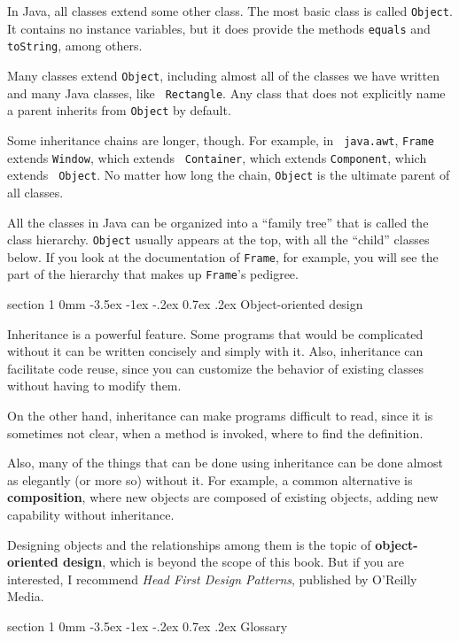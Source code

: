 \documentclass{book}
\makeatletter
\renewcommand{\section}{\@startsection 
    {section} {1} {0mm}%
    {-3.5ex \@plus -1ex \@minus -.2ex}%
    {0.7ex \@plus.2ex}%
    {\normalfont\Large\bfseries}}
\makeatother
\begin{document}
In Java, all classes extend some other class.  The most basic class is
called {\tt Object}.  It contains no instance variables, but it does
provide the methods {\tt equals} and {\tt toString}, among others.

Many classes extend {\tt Object}, including almost all of the classes
we have written and many Java classes, like {\tt
Rectangle}.  Any class that does not explicitly name a parent inherits
from {\tt Object} by default.

Some inheritance chains are longer, though.  For example, in {\tt
  java.awt}, {\tt Frame} extends {\tt Window}, which extends {\tt
  Container}, which extends {\tt Component}, which extends {\tt
  Object}.  No matter how long the chain, {\tt Object} is the ultimate
parent of all classes.

All the classes in Java can be organized into a ``family tree'' that
is called the class hierarchy.  {\tt Object} usually appears at the
top, with all the ``child'' classes below.  If you look at the
documentation of {\tt Frame}, for example, you will see the part of
the hierarchy that makes up {\tt Frame}'s pedigree.


\section {Object-oriented design}

Inheritance is a powerful feature.  Some programs that would be
complicated without it can be written concisely and simply
with it.  Also, inheritance can facilitate code reuse, since you can
customize the behavior of existing classes without having to modify
them.

On the other hand, inheritance can make programs difficult to read,
since it is sometimes not clear, when a method is invoked, where to
find the definition.  

Also, many of the things that can be done using inheritance can
be done almost as elegantly (or more so) without it.  For example,
a common alternative is {\bf composition}, where new objects are
composed of existing objects, adding new capability without
inheritance.

Designing objects and the relationships among them is the topic
of {\bf object-oriented design}, which is beyond the scope of this
book.  But if you are interested, I recommend {\em Head First Design
Patterns}, published by O'Reilly Media.


\section{Glossary}
\end{document}
